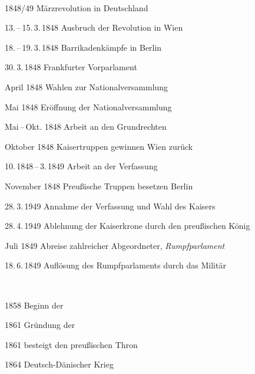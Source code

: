 \begin{chronik}
\ \\

\item[1848/49]
Märzrevolution in Deutschland

\item[13.\,--\,15.\,3.\,1848]
Ausbruch der Revolution in Wien

\item[18.\,--\,19.\,3.\,1848]
Barrikadenkämpfe in Berlin

\item[30.\,3.\,1848]
Frankfurter Vorparlament

\item[April 1848]
Wahlen zur Nationalversammlung

\item[Mai 1848]
Eröffnung der Nationalversammlung

\item[Mai\,--\,Okt. 1848]
Arbeit an den Grundrechten

\item[Oktober 1848]
Kaisertruppen gewinnen Wien zurück

\item[10.\,1848\,--\,3.\,1849]
Arbeit an der Verfassung

\item[November 1848]
Preußische Truppen besetzen Berlin

\item[28.\,3.\,1949]
Annahme der Verfassung und Wahl des Kaisers

\item[28.\,4.\,1949]
Ablehnung der Kaiserkrone durch den preußischen König

\item[Juli 1849]
Abreise zahlreicher Abgeordneter, \emph{Rumpfparlament}

\item[18.\,6.\,1849]
Auflösung des Rumpfparlaments durch das Militär

\ \\

\item[1858]
Beginn der 

\item[1861]
Gründung der 

\item[1861]
 besteigt den preußischen Thron

\item[1864]
Deutsch-Dänischer Krieg


\end{chronik}
